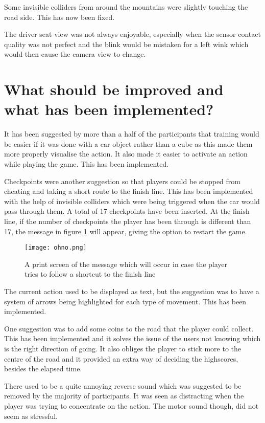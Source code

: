 Some invisible \glspl{collider} from around the mountains were slightly touching the road side. This has now been fixed.

The driver seat view was not always enjoyable, especially when the sensor contact quality was not perfect and the blink would be mistaken for a left wink which would then cause the camera view to change.

\section{What should be improved and what has been implemented?}
\label{section:implemented}
It has been suggested by more than a half of the participants that training would be easier if it was done with a car object rather than a cube as this made them more properly visualise the action. It also made it easier to activate an action while playing the game. This has been implemented.

Checkpoints were another suggestion so that players could be stopped from cheating and taking a short route to the finish line. This has been implemented with the help of invisible \glspl{collider} which were being triggered when the car would pass through them. A total of 17 checkpoints have been inserted. At the finish line, if the number of checkpoints the player has been through is different than 17, the message in figure \ref{fig:ohno} will appear, giving the option to restart the game.

\begin{figure}
  \centering
  \texttt{[image: ohno.png]}
  \caption{A print screen of the message which will occur in case the player tries to follow a shortcut to the finish line}
    \label{fig:ohno}        
\end{figure}

The current action used to be displayed as text, but the suggestion was to have a system of arrows being highlighted for each type of movement. This has been implemented.

One suggestion was to add some coins to the road that the player could collect. This has been implemented and it solves the issue of the users not knowing which is the right direction of going. It also obliges the player to stick more to the centre of the road and it provided an extra way of deciding the highscores, besides the elapsed time.  

There used to be a quite annoying reverse sound which was suggested to be removed by the majority of participants. It was seen as distracting when the player was trying to concentrate on the action. The motor sound though, did not seem as stressful.

